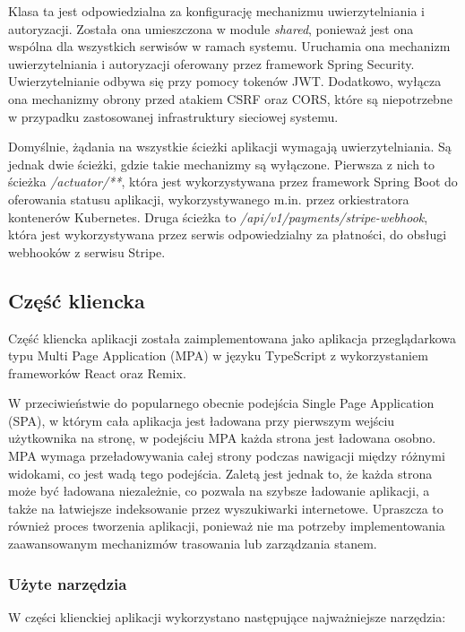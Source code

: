 Klasa ta jest odpowiedzialna za konfigurację mechanizmu uwierzytelniania i autoryzacji. Została ona umieszczona w module \textit{shared}, ponieważ jest ona wspólna dla wszystkich serwisów w ramach systemu. Uruchamia ona mechanizm uwierzytelniania i autoryzacji oferowany przez framework Spring Security. Uwierzytelnianie odbywa się przy pomocy tokenów JWT. Dodatkowo, wyłącza ona mechanizmy obrony przed atakiem CSRF oraz CORS, które są niepotrzebne w przypadku zastosowanej infrastruktury sieciowej systemu.

Domyślnie, żądania na wszystkie ścieżki aplikacji wymagają uwierzytelniania. Są jednak dwie ścieżki, gdzie takie mechanizmy są wyłączone. Pierwsza z nich to ścieżka \textit{/actuator/**}, która jest wykorzystywana przez framework Spring Boot do oferowania statusu aplikacji, wykorzystywanego m.in. przez orkiestratora kontenerów Kubernetes. Druga ścieżka to \textit{/api/v1/payments/stripe-webhook}, która jest wykorzystywana przez serwis odpowiedzialny za płatności, do obsługi webhooków z serwisu Stripe.

\subsection{Część kliencka}

Część kliencka aplikacji została zaimplementowana jako aplikacja przeglądarkowa typu Multi Page Application (MPA) w języku TypeScript z wykorzystaniem frameworków React oraz Remix.

W przeciwieństwie do popularnego obecnie podejścia Single Page Application (SPA), w którym cała aplikacja jest ładowana przy pierwszym wejściu użytkownika na stronę, w podejściu MPA każda strona jest ładowana osobno. MPA wymaga przeładowywania całej strony podczas nawigacji między różnymi widokami, co jest wadą tego podejścia. Zaletą jest jednak to, że każda strona może być ładowana niezależnie, co pozwala na szybsze ładowanie aplikacji, a także na łatwiejsze indeksowanie przez wyszukiwarki internetowe. Upraszcza to również proces tworzenia aplikacji, ponieważ nie ma potrzeby implementowania zaawansowanym mechanizmów trasowania lub zarządzania stanem.

\subsubsection{Użyte narzędzia}

W części klienckiej aplikacji wykorzystano następujące najważniejsze narzędzia:

